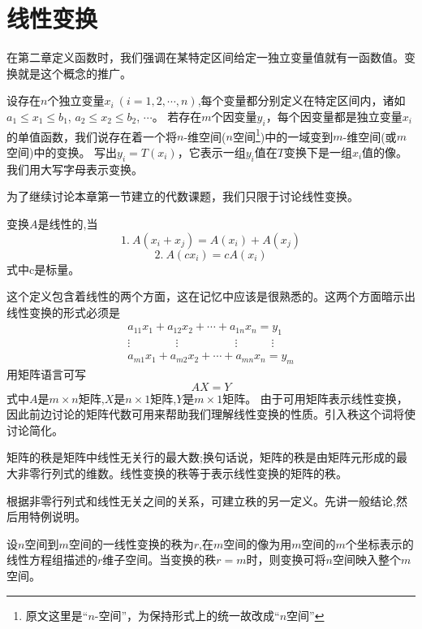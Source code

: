 \section{线性变换}
在第二章定义函数时，我们强调在某特定区间给定一独立变量值就有一函数值。变换就是这个概念的推广。

\begin{definition}[线性空间上的变换]
    设存在$n$个独立变量$x_i \ (i=1,2,\cdots,n)$,每个变量都分别定义在特定区间内，诸如$a_1≤x_1≤b_1$, $a_2≤x_2≤b_2$, $\cdots$。
    若存在$m$个因变量$y_i$，每个因变量都是独立变量$x_i$的单值函数，我们说存在着一个将$n$-维空间($n$空间\footnote{原文这里是“$n$-空间”，为保持形式上的统一故改成“$n$空间”})中的一域变到$m$-维空间(或$m$空间)中的变换。
    写出$y_i=T(x_i)$，它表示一组$y_i$值在$T$变换下是一组$x_i$值的像。我们用大写字母表示变换。
\end{definition}

为了继续讨论本章第一节建立的代数课题，我们只限于讨论线性变换。

\begin{definition}[空间上的变换]
    变换$A$是线性的,当
    \[1. \ A(x_i+x_j)=A(x_i)+A(x_j)\]
    \[2. \ A(cx_i)=cA(x_i)\]
    式中c是标量。
\end{definition}

这个定义包含着线性的两个方面，这在记忆中应该是很熟悉的。这两个方面暗示出线性变换的形式必须是
\[
\begin{array}{c}
    a_{11}x_1+a_{12}x_2+ \cdots +a_{1n}x_n=y_1 \\
    \vdots \qquad \qquad \vdots \qquad \qquad \quad \vdots \quad \qquad \vdots \\
    a_{m1}x_1+a_{m2}x_2+ \cdots +a_{mn}x_n=y_m
\end{array}    
\tag{3-45}
\]
用矩阵语言可写
\[AX=Y \tag{3-46}\]
式中$A$是$m \times n$矩阵,$X$是$n \times 1$矩阵,$Y$是$m \times 1$矩阵。
由于可用矩阵表示线性变换，因此前边讨论的矩阵代数可用来帮助我们理解线性变换的性质。引入秩这个词将使讨论简化。

\begin{definition}[秩]
    矩阵的秩是矩阵中线性无关行的最大数;换句话说，矩阵的秩是由矩阵元形成的最大非零行列式的维数。线性变换的秩等于表示线性变换的矩阵的秩。
\end{definition}

根据非零行列式和线性无关之间的关系，可建立秩的另一定义。先讲一般结论,然后用特例说明。

\begin{theorem}
    设$n$空间到$m$空间的一线性变换的秩为$r$,在$m$空间的像为用$m$空间的$m$个坐标表示的线性方程组描述的$r$维子空间。当变换的秩$r=m$时，则变换可将$n$空间映入整个$m$空间。
\end{theorem}

